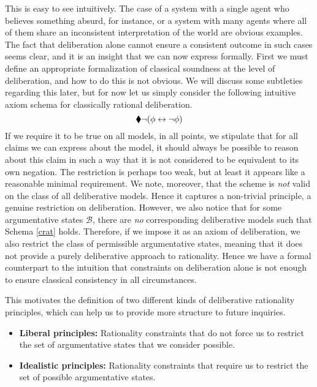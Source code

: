 \documentclass[greybox]{svmult}
\newcommand{\views}{\mathcal B}
\begin{document}
This is easy to see intuitively. The case of a system with a single agent who believes something absurd, for instance, or a system with many agents where all of them share an inconsistent interpretation of the world are obvious examples. The fact that deliberation alone cannot ensure a consistent outcome in such cases seems clear, and it is an insight that we can now express formally. First we must define an appropriate formalization of classical soundness at the level of deliberation, and how to do this is not obvious. We will discuss some subtleties regarding this later, but for now let us simply consider the following intuitive axiom schema for classically rational deliberation.
\begin{equation}\label{crat}
\cdia \neg (\phi \leftrightarrow \neg \phi)
\end{equation}
If we require it to be true on all models, in all points, we stipulate that for all claims we can express about the model, it should always be possible to reason about this claim in such a way that it is not considered to be equivalent to its own negation. The restriction is perhaps too weak, but at least it appears like a reasonable minimal requirement. We note, moreover, that the scheme is \emph{not} valid on the class of all deliberative models. Hence it captures a non-trivial principle, a genuine restriction on deliberation. However, we also notice that for some argumentative states $\views$, there are \emph{no} corresponding deliberative models such that Schema \ref{crat} holds. Therefore, if we impose it as an axiom of deliberation, we also restrict the class of permissible argumentative states, meaning that it does not provide a purely deliberative approach to rationality. Hence we have a formal counterpart to the intuition that constraints on deliberation alone is not enough to ensure classical consistency in all circumstances.

This motivates the definition of two different kinds of deliberative rationality principles, which can help us to provide more structure to future inquiries.

\begin{itemize}
\item {\bf Liberal principles:} Rationality constraints that do not force us to restrict the set of argumentative states that we consider possible. 
\item {\bf Idealistic principles:} Rationality constraints that require us to restrict the set of possible argumentative states.
\end{itemize} 
\end{document}
